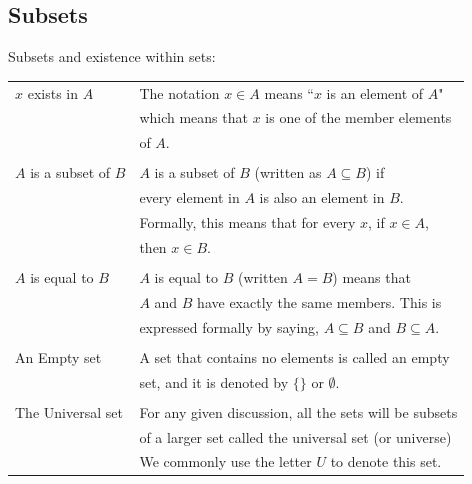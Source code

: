 \documentclass[a4paper,12pt]{book}
\begin{document}
        \newpage

        \subsection{Subsets}

        \begin{intro}{Subsets and existence within sets:}
            ~\\
            \begin{tabular}{l l}
                $x$ exists in $A$ &
                    The notation $x \in A$ means ``$x$ is an element of $A$"
                    \\ &
                    which means that $x$ is one of the member elements
                    \\ & of $A$.
                \\ \\
                $A$ is a subset of $B$ &
                    $A$ is a subset of $B$ (written as $A \subseteq B$) if
                    \\ &
                    every element in $A$ is also an element in $B$.
                    \\ &
                    Formally, this means that for every $x$, if $x \in A$,
                    \\ & then $x \in B$.
                \\ \\
                $A$ is equal to $B$ &
                    $A$ is equal to $B$ (written $A = B$) means that
                    \\ &
                    $A$ and $B$ have exactly the same members. This is
                    \\ &
                    expressed formally by saying, $A \subseteq B$ and $B \subseteq A$.
                \\ \\
                An Empty set &
                    A set that contains no elements is called an empty
                    \\ & set,
                    and it is denoted by $\{ \}$ or $\emptyset$.
                \\ \\
                The Universal set &
                    For any given discussion, all the sets will be subsets
                    \\ & of a larger set called the universal set (or universe)
                    \\ &We commonly use the letter $U$ to denote this set.
            \end{tabular}
        \end{intro}
\end{document}

